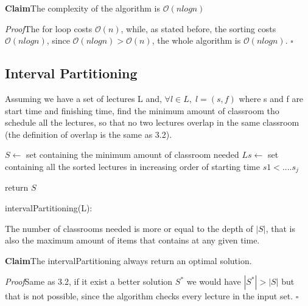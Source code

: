 \documentclass[11pt]{article}
\newenvironment{claim}[1]{\par\textbf{Claim}\space#1}{}
\newenvironment{proof}[1]{\par\textit{Proof}\space#1}{\hfill\ensuremath{\square}}
\begin{document}
\begin{claim}
The complexity of the algorithm is $\mathcal{O}{(nlogn)}$
\end{claim}
\begin{proof}
The for loop costs $\mathcal{O}{(n)}$, while, as stated before, the sorting costs $\mathcal{O}{(nlogn)}$, since $\mathcal{O}{(nlogn)} > \mathcal{O}{(n)}$, the whole algorithm is $\mathcal{O}{(nlogn)}.$
\end{proof}\\

\subsection{Interval Partitioning}
Assuming we have a set of lectures L and, $\forall l \in L ,\; l=(s,f)$ where s and f are start time and finishing time, find the minimum amount of classroom tho schedule all the lectures, so that no two lectures overlap in the same classroom (the definition of overlap is the same as 3.2).

\begin{algorithm}[H]
\SetAlgoLined
\small
{}
\BlankLine

$S \leftarrow$ set containing the minimum amount of classroom needed\;
$Ls \leftarrow$ set containing all the sorted lectures in increasing order of starting time $s1 < .... s_{j}$

\BlankLine
{}  

\BlankLine

return $S$\;
\caption{intervalPartitioning(L):}
\end{algorithm}

The number of classrooms needed is more or equal to the depth of $|S|$, that is also the maximum amount of items that contains at any given time.	\\

\begin{claim}
The intervalPartitioning always return an optimal solution.
\end{claim}
\begin{proof}
Same as 3.2, if it exist a better solution $S^{*}$ we would have $|S^{*}| > |S|$ but that is not possible, since the algorithm checks every lecture in the input set. 
\end{proof}\\
 
\end{document}
